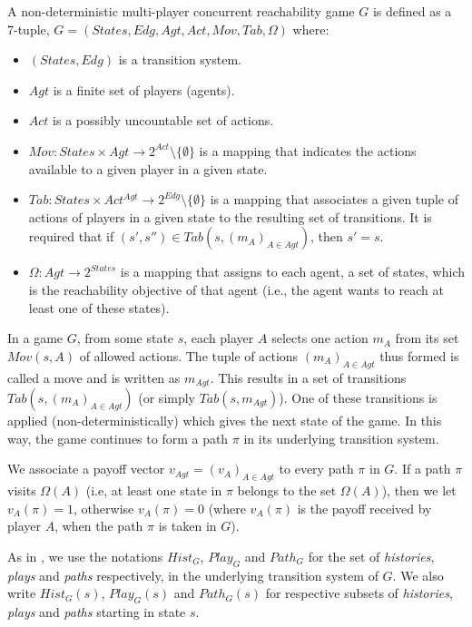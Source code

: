 \begin{definition}
\label{def:game}
A non-deterministic multi-player concurrent reachability game $G$ is defined as a 7-tuple, $G = (States, Edg, Agt, Act, Mov, Tab, \Omega)$ where:
\begin{itemize}
\item $(States, Edg)$ is a transition system.
\item $Agt$ is a finite set of players (agents).
\item $Act$ is a possibly uncountable set of actions.
\item $Mov: States \times Agt \rightarrow 2^{Act}\setminus \lbrace \emptyset \rbrace$ is a mapping that indicates the actions available to a given player in a given state.
\item $Tab: States \times Act^{Agt} \rightarrow 2^{Edg}\setminus \lbrace \emptyset \rbrace$ is a mapping that associates a given tuple of actions of players in a given state to the resulting set of transitions. It is required that if $(s', s'') \in Tab(s, (m_{A})_{A\in Agt})$, then $s' = s$.
\item $\Omega : Agt \rightarrow 2^{States}$ is a mapping that assigns to each agent, a set of states, which is the reachability objective of that agent (i.e., the agent wants to reach at least one of these states).
\end{itemize}
\end{definition}

In a game $G$, from some state $s$, each player $A$ selects one action $m_{A}$ from its set $Mov(s, A)$ of allowed actions. The tuple of actions $(m_{A})_{A\in Agt}$ thus formed is called a move and is written as $m_{Agt}$. This results in a set of transitions $Tab(s, (m_{A})_{A\in Agt})$ (or simply $Tab(s, m_{Agt})$). One of these transitions is applied (non-deterministically) which gives the next state of the game. In this way, the game continues to form a path $\pi$ in its underlying transition system.

We associate a payoff vector $v_{Agt} = (v_{A})_{A\in Agt}$ to every path $\pi$ in $G$. If a path $\pi$ visits $\Omega (A)$ (i.e, at least one state in $\pi$ belongs to the set $\Omega (A)$), then we let $v_{A}(\pi) = 1$, otherwise $v_{A}(\pi) = 0$ (where $v_{A}(\pi)$ is the payoff received by player $A$, when the path $\pi$ is taken in $G$).

As in \cite{BBM-concur10,BBM-report}, we use the notations $Hist_{G}$, $Play_{G}$ and $Path_{G}$ for the set of \textit{histories}, \textit{plays} and \textit{paths} respectively, in the underlying transition system of $G$. We also write $Hist_{G}(s)$, $Play_{G}(s)$ and $Path_{G}(s)$ for respective subsets of \textit{histories}, \textit{plays} and \textit{paths} starting in state $s$.

